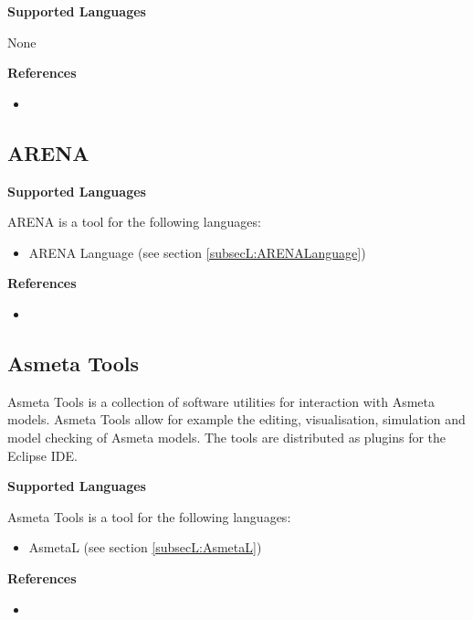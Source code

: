 \textbf{Supported Languages}

None


\textbf{References}
\begin{itemize}
	
\item {}
\end{itemize}



\subsection{ARENA}
\label{subsecT:ARENATool}



\textbf{Supported Languages}

ARENA is a tool for the following languages:
\begin{itemize}
	\item ARENA Language (see section \ref{subsecL:ARENALanguage})
\end{itemize}


\textbf{References}
\begin{itemize}
	
\item {}
\end{itemize}



\subsection{Asmeta Tools}
\label{subsecT:Asmeta}


Asmeta Tools is a collection of software utilities for interaction with Asmeta models. Asmeta Tools allow for example the editing, visualisation, simulation and model checking of Asmeta models. The tools are distributed as plugins for the Eclipse IDE.

\textbf{Supported Languages}

Asmeta Tools is a tool for the following languages:
\begin{itemize}
	\item AsmetaL (see section \ref{subsecL:AsmetaL})
\end{itemize}


\textbf{References}
\begin{itemize}
	
\item {}
\end{itemize}



